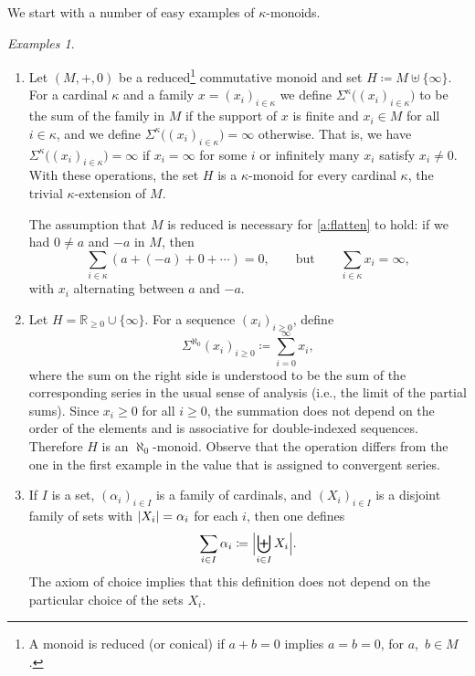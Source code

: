 \documentclass[a4paper,11pt,oneside]{amsart}
\theoremstyle{remark}
\newtheorem{examples}[teor]{Examples}
\DeclarePairedDelimiter{\card}{\lvert}{\rvert}
\newcommand{\defit}[1]{\textsf{#1}}
\newcommand{\bR}{\mathbb R}
\begin{document}
We start with a number of easy examples of $\kappa$-monoids.

\begin{examples} \label{e:kappa}
  \mbox{}
    \begin{enumerate}
  \item \label{e-kappa:trivial} Let $(M,+,0)$ be a reduced\footnote{A monoid is \defit{reduced} (or \defit{conical}) if $a+b=0$ implies $a=b=0$, for $a$,~$b \in M$.} commutative monoid and set $H \coloneqq M \uplus \{\infty\}$.
    For a cardinal $\kappa$ and a family $x=(x_i)_{i \in \kappa}$ we define $\Sigma^\kappa\big( (x_i)_{i \in \kappa} \big)$ to be the sum of the family in $M$ if the support of $x$ is finite and $x_i \in M$ for all $i \in \kappa$, and we define $\Sigma^\kappa\big( (x_i)_{i \in \kappa} \big) = \infty$ otherwise.
    That is, we have $\Sigma^\kappa\big( (x_i)_{i \in \kappa} \big)=\infty$ if $x_i=\infty$ for some $i$ or infinitely many $x_i$ satisfy $x_i \ne 0$.
    With these operations, the set $H$ is a $\kappa$-monoid for every cardinal $\kappa$, the \defit{trivial $\kappa$-extension} of $M$.
    
    The assumption that $M$ is reduced is necessary for \ref{a:flatten} to hold: if we had $0 \ne a$ and $-a$ in $M$, then
    \[
      \sum_{i \in \kappa} (a + (-a) + 0 + \cdots) = 0, \qquad\text{but} \qquad \sum_{i \in \kappa} x_i = \infty,
    \]
    with $x_i$ alternating between $a$ and $-a$.

  \item \label{e-kappa:reals} Let $H = \bR_{\ge 0}\cup \{\infty\}$.
    For a sequence $(x_i)_{i \ge 0}$, define
    \[
      \Sigma^{\aleph_0} (x_i)_{i \ge 0} \coloneqq \sum_{i=0}^\infty x_i,
    \]
    where the sum on the right side is understood to be the sum of the corresponding series in the usual sense of analysis (i.e., the limit of the partial sums).
    Since $x_i \ge 0$ for all $i \ge 0$, the summation does not depend on the order of the elements and is associative for double-indexed sequences.
    Therefore $H$ is an $\aleph_0$-monoid.
    Observe that the operation differs from the one in the first example in the value that is assigned to convergent series.

  \item \label{kappa:cardinals}
    If $I$ is a set, $(\alpha_i)_{i \in I}$ is a family of cardinals, and $(X_i)_{i \in I}$ is a disjoint family of sets with $\card{X_i}=\alpha_i$ for each $i$, then one defines
    \[
      \sum_{i \in I} \alpha_i \coloneqq \card[\Big]{\biguplus_{i \in I} X_i}.
    \]
    The axiom of choice implies that this definition does not depend on the particular choice of the sets $X_i$.


\end{enumerate}
\end{examples}
\end{document}
